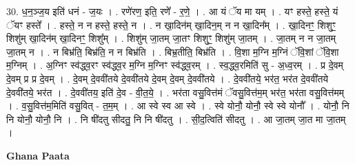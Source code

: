 \documentclass[17pt]{extarticle}
\begin{document}
30. ध॒न॒ञ्ज॒य इति॑ धनं - ज॒यः । . रणे॑रण॒ इति॒ रणे᳚ - र॒णे॒ । . आ यं ॅय मा यम् । . यꣳ हस्ते॒ हस्ते॒ यं ॅयꣳ हस्ते᳚ । . हस्ते॒ न न हस्ते॒ हस्ते॒ न । . न खा॒दिन॑म् खा॒दिन॒म् न न खा॒दिन᳚म् । . खा॒दिनꣳ॒॒ शिशुꣳ॒॒ शिशु॑म् खा॒दिन॑म् खा॒दिनꣳ॒॒ शिशु᳚म् । . शिशु॑म् जा॒तम् जा॒तꣳ शिशुꣳ॒॒ शिशु॑म् जा॒तम् । . जा॒तम् न न जा॒तम् जा॒तम् न । . न बिभ्र॑ति॒ बिभ्र॑ति॒ न न बिभ्र॑ति । . बिभ्र॒तीति॒ बिभ्र॑ति । . वि॒शा म॒ग्नि म॒ग्निं ॅवि॒शां ॅवि॒शा म॒ग्निम् । . अ॒ग्निꣳ स्व॑द्ध्व॒रꣳ स्व॑द्ध्व॒र म॒ग्नि म॒ग्निꣳ स्व॑द्ध्व॒रम् । . स्व॒द्ध्व॒रमिति॑ सु - अ॒ध्व॒रम् । . प्र दे॒वम् दे॒वम् प्र प्र दे॒वम् । . दे॒वम् दे॒ववी॑तये दे॒ववी॑तये दे॒वम् दे॒वम् दे॒ववी॑तये । . दे॒ववी॑तये॒ भर॑त॒ भर॑त दे॒ववी॑तये दे॒ववी॑तये॒ भर॑त । . दे॒ववी॑तय॒ इति॑ दे॒व - वी॒त॒ये॒ । . भर॑ता वसु॒वित्त॑मं ॅवसु॒वित्त॑म॒म् भर॑त॒ भर॑ता वसु॒वित्त॑मम् । . व॒सु॒वित्त॑म॒मिति॑ वसु॒वित् - त॒म॒म् । . आ स्वे स्व आ स्वे । . स्वे योनौ॒ योनौ॒ स्वे स्वे योनौ᳚ । . योनौ॒ नि नि योनौ॒ योनौ॒ नि । . नि षी॑दतु सीदतु॒ नि नि षी॑दतु । . सी॒द॒त्विति॑ सीदतु । . आ जा॒तम् जा॒त मा जा॒तम् । \newline

\textbf{Ghana Paata } \newline
\end{document}
